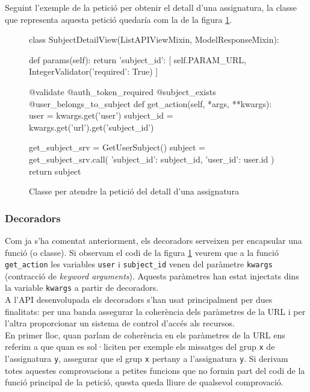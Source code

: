 Seguint l'exemple de la petició per obtenir el detall d'una assignatura,  la classe que representa aquesta petició quedaría com la de la figura \ref{fig:subject_detail_class}.

\begin{figure}[h!]
	\begin{python}
class SubjectDetailView(ListAPIViewMixin, ModelResponseMixin):

	def params(self):
		return {
			'subject_id': [
				self.PARAM_URL, 
				IntegerValidator({'required': True})
			]
		}
		
	@validate
	@auth_token_required
	@subject_exists
	@user_belongs_to_subject
	def get_action(self, *args, **kwargs):
		user = kwargs.get('user')
		subject_id = kwargs.get('url').get('subject_id')
		
		get_subject_srv = GetUserSubject()
		subject = get_subject_srv.call({
			'subject_id': subject_id, 
			'user_id': user.id
		})
		return subject
	\end{python}
	\label{fig:subject_detail_class}
	\caption{Classe per atendre la petició del detall d'una assignatura}
\end{figure}

\subsubsection{Decoradors}
Com ja s'ha comentat anteriorment, els decoradors serveixen per encapsular una funció (o classe). Si observam el codi de la figura \ref{fig:subject_detail_class} veurem que a la funció \texttt{get\_action} les variables \texttt{user} i \texttt{subject\_id} venen del paràmetre \texttt{kwargs} (contracció de \emph{keyword arguments}). Aquests paràmetres han estat injectats dins la variable \texttt{kwargs} a partir de decoradors.\\

A l'\ac{API} desenvolupada els decoradors s'han usat principalment per dues finalitats: per una banda assegurar la coherència dels paràmetres de la \ac{URL} i per l'altra proporcionar un sistema de control d'accés als recursos. \\

En primer lloc, quan parlam de coherència en els paràmetres de la \ac{URL} ens referim a que quan es sol·liciten per exemple els missatges del grup \texttt{x} de l'assignatura \texttt{y}, assegurar que el grup \texttt{x} pertany a l'assignatura \texttt{y}. Si derivam totes aquestes comprovacions a petites funcions que no formin part del codi de la funció principal de la petició, questa queda lliure de qualsevol comprovació.\\

